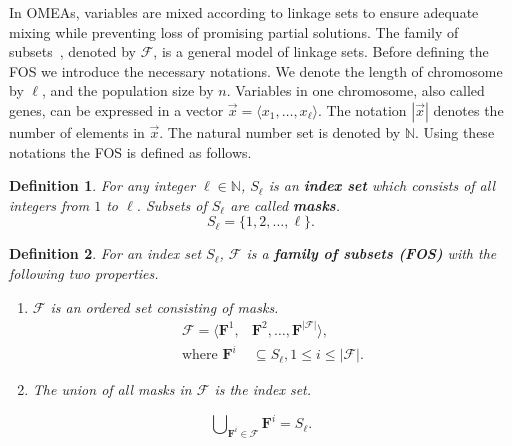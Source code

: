 \documentclass{sig-alternate}
\newtheorem{definition}{Definition}
\begin{document}
In OMEAs, variables are mixed according to linkage sets
to ensure adequate mixing while preventing loss of promising partial solutions.
The family of subsets~\cite{2010_LTGA}, denoted by $\mathcal F$, is a general model of linkage sets.
Before defining the FOS we introduce the necessary notations.
We denote the length of chromosome by $\ell$, and the population size by $n$.
Variables in one chromosome, also called genes, can be expressed in a vector $\vec{x} = \langle x_1, \dots, x_\ell\rangle$.
The notation $|{\vec x}|$ denotes the number of elements in $\vec x$.
The natural number set is denoted by $\mathbb N$.
Using these notations the FOS is defined as follows.

\begin{definition}
For any integer $\ell\in{\mathbb N}$, $S_\ell$ is an {\bf index set} which consists of all integers from $1$ to $\ell$.
Subsets of $S_\ell$ are called {\bf masks}.
\begin{equation*}
S_\ell = \{ 1, 2, \dots, \ell\}.
\end{equation*}
\end{definition}

\begin{definition}
For an index set $S_\ell$, $\mathcal F$ is a {\bf{family of subsets (FOS)}} with the following two properties.
\begin{enumerate}

\item $\mathcal F$ is an ordered set consisting of masks.
\begin{equation*}
\begin{split}
{\mathcal F} = \langle {\mathbf F}^1, &{\mathbf F}^2, \dots, {\mathbf F}^{|{\mathcal F}|}\rangle,\\
\text{where } {\mathbf F}^i &\subseteq S_\ell, 1\leq i \leq |{\mathcal F}|.
\end{split}
\end{equation*}

\item The union of all masks in $\mathcal F$ is the index set.
\end{enumerate}
\begin{equation*}
\bigcup\nolimits_{{\mathbf F}^i \in {\mathcal F}} {\mathbf F}^i = S_\ell.
\end{equation*}
\end{definition}
\end{document}

